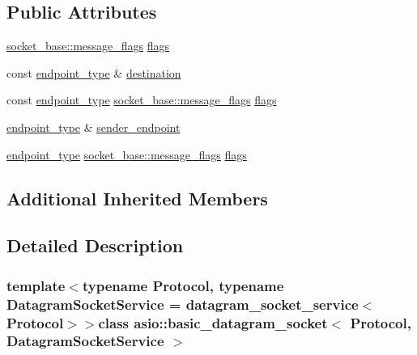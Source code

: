 \subsection*{Public Attributes}
\begin{DoxyCompactItemize}
\item 
\hyperlink{classasio_1_1socket__base_ac3cf77465dfedfe1979b5415cf32cc94}{socket\+\_\+base\+::message\+\_\+flags} \hyperlink{classasio_1_1basic__datagram__socket_a787b917059f9c50a483196d3edaf800c}{flags}
\item 
const \hyperlink{classasio_1_1basic__datagram__socket_af952c8d18c85588a16531cfc54a172bb}{endpoint\+\_\+type} \& \hyperlink{classasio_1_1basic__datagram__socket_a63941967078c45fcc3c315ee150070fb}{destination}
\item 
const \hyperlink{classasio_1_1basic__datagram__socket_af952c8d18c85588a16531cfc54a172bb}{endpoint\+\_\+type} \hyperlink{classasio_1_1socket__base_ac3cf77465dfedfe1979b5415cf32cc94}{socket\+\_\+base\+::message\+\_\+flags} \hyperlink{classasio_1_1basic__datagram__socket_a21209afeb1d5c1e0c76f3165dcfba9de}{flags}
\item 
\hyperlink{classasio_1_1basic__datagram__socket_af952c8d18c85588a16531cfc54a172bb}{endpoint\+\_\+type} \& \hyperlink{classasio_1_1basic__datagram__socket_aab9cb430375ca536da3d5a145e6b780e}{sender\+\_\+endpoint}
\item 
\hyperlink{classasio_1_1basic__datagram__socket_af952c8d18c85588a16531cfc54a172bb}{endpoint\+\_\+type} \hyperlink{classasio_1_1socket__base_ac3cf77465dfedfe1979b5415cf32cc94}{socket\+\_\+base\+::message\+\_\+flags} \hyperlink{classasio_1_1basic__datagram__socket_ad7950a8735d696a465df0eb6f4cefcae}{flags}
\end{DoxyCompactItemize}
\subsection*{Additional Inherited Members}


\subsection{Detailed Description}
\subsubsection*{template$<$typename Protocol, typename Datagram\+Socket\+Service = datagram\+\_\+socket\+\_\+service$<$\+Protocol$>$$>$class asio\+::basic\+\_\+datagram\+\_\+socket$<$ Protocol, Datagram\+Socket\+Service $>$}

